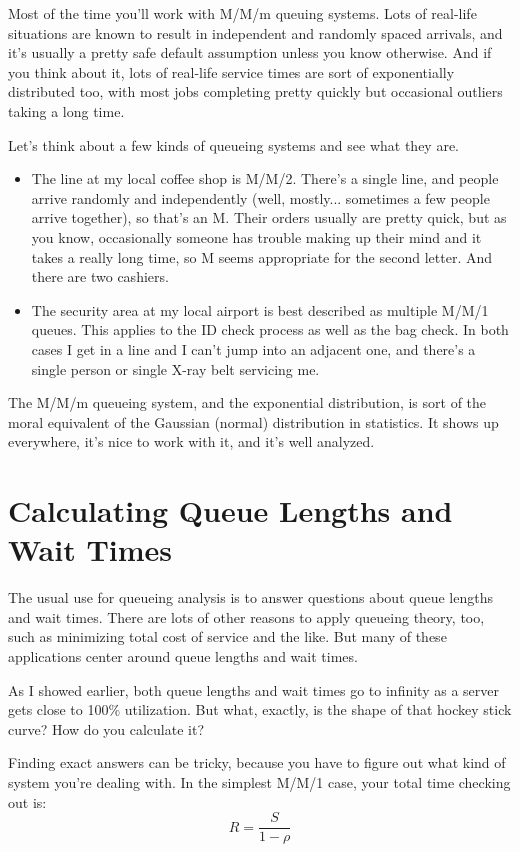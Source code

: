 \documentclass{vivid_layout}
\begin{document}
Most of the time you'll work with M/M/m queuing systems. Lots of real-life situations are known to result in independent and randomly spaced arrivals, and it's usually a pretty safe default assumption unless you know otherwise. And if you think about it, lots of real-life service times are sort of exponentially distributed too, with most jobs completing pretty quickly but occasional outliers taking a long time.

Let's think about a few kinds of queueing systems and see what they are.

\begin{itemize}
\item The line at my local coffee shop is M/M/2. There's a single line, and people arrive randomly and independently (well, mostly... sometimes a few people arrive together), so that's an M. Their orders usually are pretty quick, but as you know, occasionally someone has trouble making up their mind and it takes a really long time, so M seems appropriate for the second letter. And there are two cashiers.
\item The security area at my local airport is best described as multiple M/M/1 queues. This applies to the ID check process as well as the bag check. In both cases I get in a line and I can't jump into an adjacent one, and there's a single person or single X-ray belt servicing me.
\end{itemize}

The M/M/m queueing system, and the exponential distribution, is sort of the moral equivalent of the Gaussian (normal) distribution in statistics. It shows up everywhere, it's nice to work with it, and it's well analyzed.

\section{Calculating Queue Lengths and Wait Times}

The usual use for queueing analysis is to answer questions about queue lengths and wait times. There are lots of other reasons to apply queueing theory, too, such as minimizing total cost of service and the like. But many of these applications center around queue lengths and wait times.

As I showed earlier, both queue lengths and wait times go to infinity as a server gets close to 100\% utilization. But what, exactly, is the shape of that hockey stick curve? How do you calculate it?

Finding exact answers can be tricky, because you have to figure out what kind of system you're dealing with. In the simplest M/M/1 case, your total time checking out is:
\[
  R = \frac{S}{1 - \rho}
\]
\end{document}
